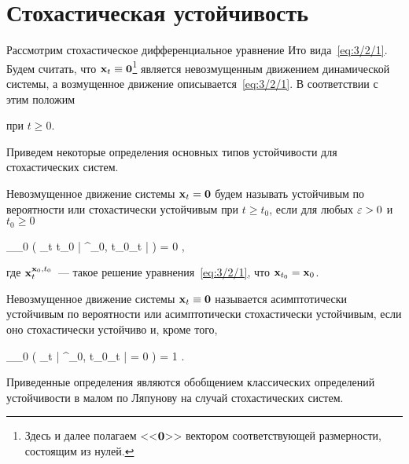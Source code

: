\section{Стохастическая устойчивость}



Рассмотрим стохастическое дифференциальное уравнение Ито вида~\vref{eq:3/2/1}. Будем считать, что $\mathbf{x}_t \equiv \mathbf{0}$\footnote{ Здесь и далее полагаем <<$\mathbf{0}$>> вектором соответствующей размерности, состоящим из нулей. } является невозмущенным движением динамической системы, а возмущенное движение описывается~\ref{eq:3/2/1}. В соответствии с этим положим

\eeq

при $t \geqslant 0$.

\br

Приведем некоторые определения основных типов устойчивости для стохастических систем.

\begin{df}
	Невозмущенное движение системы $\mathbf{x}_t = \mathbf{0}$ будем называть устойчивым по вероятности или стохастически устойчивым при $t \geqslant t_0$, если для любых $\varepsilon > 0$ и $t_0 \geqslant 0$

	\beqn
		\lim\limits_{_0 \to {}} \prob \biggl( \sup\limits_{t \geqslant t_0} \bigl| \m{x}^{_0, t_0}_t \bigr| \geqslant \eps \biggr) = 0 \mbox{,}
	\eeqn

	где $\mathbf{x}^{\mathbf{x}_0, t_0}_t$~--- такое решение уравнения~\ref{eq:3/2/1}, что $\mathbf{x}_{t_0} = \mathbf{x}_0$.
\end{df}

\begin{df}
	Невозмущенное движение системы $\mathbf{x}_t \equiv \mathbf{0}$ называется асимптотически устойчивым по вероятности или асимптотически стохастически устойчивым, если оно стохастически устойчиво и, кроме того,
	
	\beqn
		\lim\limits_{_0 \to {}} \prob \biggl( \lim\limits_{t \to \infty} \bigl| \m{x}^{_0, t_0}_t \bigr| = 0 \biggr) = 1 \mbox{.}
	\eeqn
\end{df}

Приведенные определения являются обобщением классических определений устойчивости в малом по Ляпунову на случай стохастических систем.

